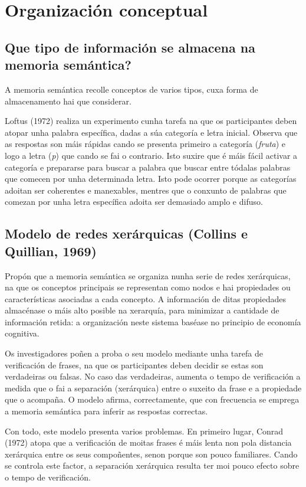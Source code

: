 \documentclass[a4paper,11pt]{article}
\begin{document}
\section{Organización conceptual}
\subsection{Que tipo de información se almacena na memoria semántica?}
A memoria semántica recolle conceptos de varios tipos, cuxa forma de almacenamento hai que considerar.

Loftus (1972) realiza un experimento cunha tarefa na que os participantes deben atopar unha palabra específica, dadas a súa categoría e letra inicial. Observa que as respostas son máis rápidas cando se presenta primeiro a categoría (\textit{fruta}) e logo a letra (\textit{p}) que cando se fai o contrario. Isto suxire que é máis fácil activar a categoría e prepararse para buscar a palabra que buscar entre tódalas palabras que comecen por unha determinada letra. Isto pode ocorrer porque as categorías adoitan ser coherentes e manexables, mentres que o conxunto de palabras que comezan por unha letra específica adoita ser demasiado amplo e difuso. 

\subsection{Modelo de redes xerárquicas (Collins e Quillian, 1969)}
Propón que a memoria semántica se organiza nunha serie de redes xerárquicas, na que os conceptos principais se representan como nodos e hai propiedades ou características asociadas a cada concepto. A información de ditas propiedades almacénase o máis alto posible na xerarquía, para minimizar a cantidade de información retida: a organización neste sistema baséase no principio de economía cognitiva. 

Os investigadores poñen a proba o seu modelo mediante unha tarefa de verificación de frases, na que os participantes deben decidir se estas son verdadeiras ou falsas. No caso das verdadeiras, aumenta o tempo de verificación a medida que o fai a separación (xerárquica) entre o suxeito da frase e a propiedade que o acompaña. O modelo afirma, correctamente, que con frecuencia se emprega a memoria semántica para inferir as respostas correctas. 

Con todo, este modelo presenta varios problemas. En primeiro lugar, Conrad (1972) atopa que a verificación de moitas frases é máis lenta non pola distancia xerárquica entre os seus compoñentes, senon porque son pouco familiares. Cando se controla este factor, a separación xerárquica resulta ter moi pouco efecto sobre o tempo de verificación.
\end{document}
